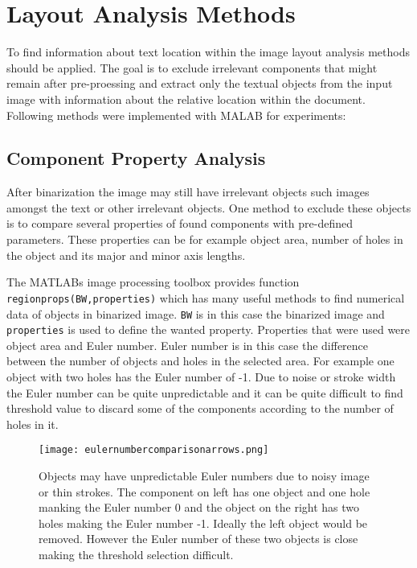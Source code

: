 \documentclass{article}
\def\code#1{\texttt{#1}}
\begin{document}
    \newpage
    \section{Layout Analysis Methods}
      To find information about text location within the image layout analysis methods should be applied. The goal is to exclude irrelevant components that might remain after pre-proessing and extract only the textual objects from the input image with information about the relative location within the document. Following methods were implemented with MALAB for experiments:

        \subsection{Component Property Analysis}
          After binarization the image may still have irrelevant objects such images amongst the text or other irrelevant objects. One method to exclude these objects is to compare several properties of found components with pre-defined parameters. These properties can be for example object area, number of holes in the object and its major and minor axis lengths.

          The MATLABs image processing toolbox  provides function \code{regionprops(BW,properties)} which has many useful methods to find numerical data of objects in binarized image. \code{BW} is in this case the binarized image and \code{properties} is used to define the wanted property. Properties that were used were object area and Euler number. Euler number is in this case the difference between the number of objects and holes in the selected area. For example one object with two holes has the Euler number of -1. Due to noise or stroke width the Euler number can be quite unpredictable and it can be quite difficult to find threshold value to discard some of the components according to the number of holes in it.

          \begin{figure}[!ht]
            \centering
            \texttt{[image: eulernumbercomparisonarrows.png]}
            \caption{Objects may have unpredictable Euler numbers due to noisy image or thin strokes. The component on left has one object and one hole manking the Euler number 0 and the object on the right has two holes making the Euler number -1. Ideally the left object would be removed. However the Euler number of these two objects is close making the threshold selection difficult.   \label{fig:eulernumbercomp} }
          \end{figure}
\end{document}
